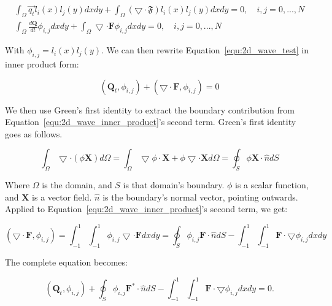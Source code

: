 \begin{gather}
    \int_{\Omega} \overrightarrow{q_t} l_i(x) l_j(y) dx dy + \int_{\Omega } \left( \bigtriangledown \cdot \mathfrak{F} \right) l_i(x) l_j(y) dx dy = 0, \quad i,j = 0, ..., N \\
    \int_{\Omega} \frac{d\mathbf{Q}}{dt} \phi_{i, j} dx dy
    + \int _{\Omega} \bigtriangledown \cdot \mathbf{F} \phi_{i, j} dx dy = 0, \quad i,j = 0, ..., N \label{equ:2d_wave_test}
\end{gather}

With $\phi_{i, j} = l_i(x)l_j(y)$. We can then rewrite Equation~\ref{equ:2d_wave_test} in inner
product form: 

\begin{equation} \label{equ:2d_wave_inner_product}
	\left( \mathbf{Q}_t, \phi_{i, j} \right) + \left( \bigtriangledown \cdot \mathbf{F}, \phi_{i, j} \right) = 0
\end{equation}

We then use Green's first identity to extract the boundary contribution from
Equation~\ref{equ:2d_wave_inner_product}'s second term. Green's first identity goes as follows.

\begin{equation}
    \int_{\Omega} \bigtriangledown \cdot \left( \phi \mathbf{X} \right) d\Omega  = 
    \int_{\Omega} \bigtriangledown \phi \cdot \mathbf{X} + \phi \bigtriangledown \cdot \mathbf{X} d\Omega = \oint _{S} \phi \mathbf{X} \cdot \widehat{n} dS
\end{equation}

Where $\Omega$ is the domain, and $S$ is that domain's boundary. $\phi$ is a scalar function, and
$\mathbf{X}$ is a vector field. $\widehat{n}$ is the boundary's normal vector, pointing outwards.
Applied to Equation~\ref{equ:2d_wave_inner_product}'s second term, we get:

\begin{equation} \label{equ:flux_green}
    \left( \bigtriangledown \cdot \mathbf{F}, \phi_{i, j} \right) = \int_{-1}^{1}\int_{-1}^{1}\phi_{i, j} \bigtriangledown \cdot \mathbf{F} dx dy = \oint_{S}\phi_{i, j} \mathbf{F} \cdot \widehat{n}dS - \int_{-1}^{1}\int_{-1}^{1} \mathbf{F} \cdot \bigtriangledown \phi_{i, j} dx dy
\end{equation}

The complete equation becomes:

\begin{equation} \label{equ:integral_equ}
    \left( \mathbf{Q}_t, \phi_{i, j} \right) + \oint_{S}\phi_{i, j} \mathbf{F}^* \cdot \widehat{n}dS - \int_{-1}^{1}\int_{-1}^{1} \mathbf{F} \cdot \bigtriangledown \phi_{i, j} dx dy = 0.
\end{equation}

